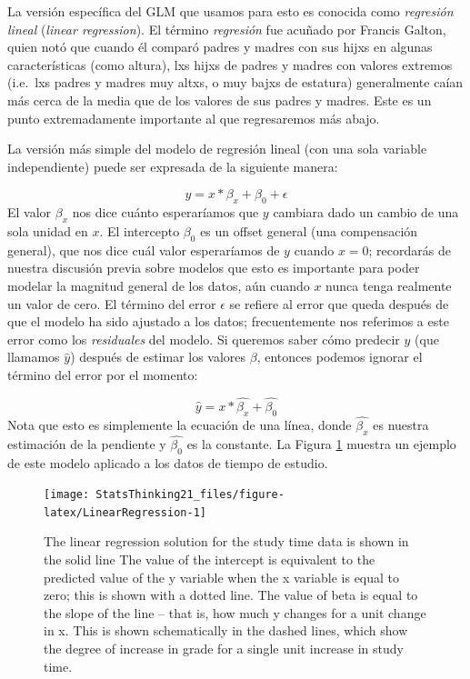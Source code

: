\documentclass[
  12pt,
]{book}
\begin{document}
La versión específica del GLM que usamos para esto es conocida como \emph{regresión lineal} (\emph{linear regression}). El término \emph{regresión} fue acuñado por Francis Galton, quien notó que cuando él comparó padres y madres con sus hijxs en algunas características (como altura), lxs hijxs de padres y madres con valores extremos (i.e.~lxs padres y madres muy altxs, o muy bajxs de estatura) generalmente caían más cerca de la media que de los valores de sus padres y madres. Este es un punto extremadamente importante al que regresaremos más abajo.

La versión más simple del modelo de regresión lineal (con una sola variable independiente) puede ser expresada de la siguiente manera:

\[
y = x * \beta_x + \beta_0 + \epsilon
\]
El valor \(\beta_x\) nos dice cuánto esperaríamos que \(y\) cambiara dado un cambio de una sola unidad en \(x\). El intercepto \(\beta_0\) es un offset general (una compensación general), que nos dice cuál valor esperaríamos de \(y\) cuando \(x=0\); recordarás de nuestra discusión previa sobre modelos que esto es importante para poder modelar la magnitud general de los datos, aún cuando \(x\) nunca tenga realmente un valor de cero. El término del error \(\epsilon\) se refiere al error que queda después de que el modelo ha sido ajustado a los datos; frecuentemente nos referimos a este error como los \emph{residuales} del modelo. Si queremos saber cómo predecir \(y\) (que llamamos \(\hat{y}\)) después de estimar los valores \(\beta\), entonces podemos ignorar el término del error por el momento:

\[
\hat{y} = x * \hat{\beta_x} + \hat{\beta_0} 
\]
Nota que esto es simplemente la ecuación de una línea, donde \(\hat{\beta_x}\) es nuestra estimación de la pendiente y \(\hat{\beta_0}\) es la constante. La Figura \ref{fig:LinearRegression} muestra un ejemplo de este modelo aplicado a los datos de tiempo de estudio.

\begin{figure}
\texttt{[image: StatsThinking21\_files/figure-latex/LinearRegression-1]} \caption{The linear regression solution for the study time data is shown in the solid line The value of the intercept is equivalent to the predicted value of the y variable when the x variable is equal to zero; this is shown with a dotted line.  The value of beta is equal to the slope of the line -- that is, how much y changes for a unit change in x.  This is shown schematically in the dashed lines, which show the degree of increase in grade for a single unit increase in study time.}\label{fig:LinearRegression}
\end{figure}
\end{document}
